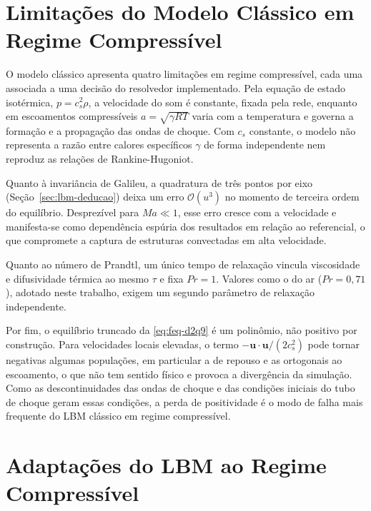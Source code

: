 \section{Limitações do Modelo Clássico em Regime Compressível}\label{sec:lbm-limitacoes-classico}

O modelo clássico apresenta quatro limitações em regime compressível, cada uma associada a uma decisão do resolvedor implementado.
Pela equação de estado isotérmica, $p = c_s^2 \rho$, a velocidade do som é constante, fixada pela rede, enquanto em escoamentos compressíveis $a = \sqrt{\gamma R T}$ varia com a temperatura e governa a formação e a propagação das ondas de choque.
Com $c_s$ constante, o modelo não representa a razão entre calores específicos $\gamma$ de forma independente nem reproduz as relações de Rankine-Hugoniot.

Quanto à invariância de Galileu, a quadratura de três pontos por eixo (Seção~\ref{sec:lbm-deducao}) deixa um erro $\mathcal{O}(u^3)$ no momento de terceira ordem do equilíbrio.
Desprezível para $Ma \ll 1$, esse erro cresce com a velocidade e manifesta-se como dependência espúria dos resultados em relação ao referencial, o que compromete a captura de estruturas convectadas em alta velocidade.

Quanto ao número de Prandtl, um único tempo de relaxação vincula viscosidade e difusividade térmica ao mesmo $\tau$ e fixa $Pr = 1$.
Valores como o do ar ($Pr = 0{,}71$), adotado neste trabalho, exigem um segundo parâmetro de relaxação independente.

Por fim, o equilíbrio truncado da \eqref{eq:feq-d2q9} é um polinômio, não positivo por construção.
Para velocidades locais elevadas, o termo $-\mathbf{u} \cdot \mathbf{u} / (2c_s^2)$ pode tornar negativas algumas populações, em particular a de repouso e as ortogonais ao escoamento, o que não tem sentido físico e provoca a divergência da simulação.
Como as descontinuidades das ondas de choque e das condições iniciais do tubo de choque geram essas condições, a perda de positividade é o modo de falha mais frequente do LBM clássico em regime compressível.


\section{Adaptações do LBM ao Regime Compressível}\label{sec:lbm-adaptacoes-compressivel}

